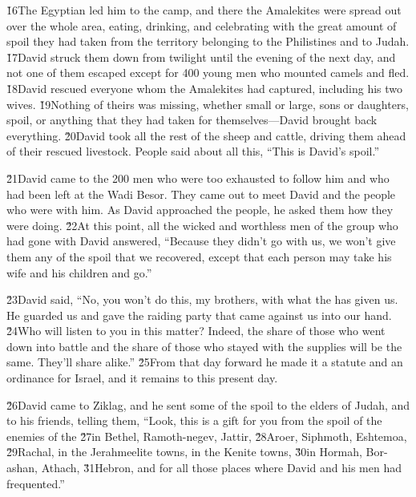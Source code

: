\v{16}The Egyptian led him to the camp, and there the Amalekites were spread out over the whole area, eating, drinking, and celebrating with the great amount of spoil they had taken from the territory belonging to the Philistines and to Judah. \v{17}David struck them down from twilight until the evening of the next day, and not one of them escaped except for 400 young men who mounted camels and fled. \v{18}David rescued everyone whom the Amalekites had captured, including his two wives. \v{19}Nothing of theirs was missing, whether small or large, sons or daughters, spoil, or anything that they had taken for themselves---David brought back everything. \v{20}David took all the rest of the sheep and cattle, driving them ahead of their rescued livestock. People said about all this, ``This is David's spoil.''

\v{21}David came to the 200 men who were too exhausted to follow him and who had been left at the Wadi Besor. They came out to meet David and the people who were with him. As David approached the people, he asked them how they were doing. \v{22}At this point, all the wicked and worthless men of the group who had gone with David answered, ``Because they didn't go with us, we won't give them any of the spoil that we recovered, except that each person may take his wife and his children and go.''

\v{23}David said, ``No, you won't do this, my brothers, with what the  has given us. He guarded us and gave the raiding party that came against us into our hand. \v{24}Who will listen to you in this matter? Indeed, the share of those who went down into battle and the share of those who stayed with the supplies will be the same. They'll share alike.'' \v{25}From that day forward he made it a statute and an ordinance for Israel, and it remains to this present day.

\v{26}David came to Ziklag, and he sent some of the spoil to the elders of Judah, and to his friends, telling them, ``Look, this is a gift for you from the spoil of the enemies of the  \v{27}in Bethel, Ramoth-negev, Jattir, \v{28}Aroer, Siphmoth, Eshtemoa, \v{29}Rachal, in the Jerahmeelite towns, in the Kenite towns, \v{30}in Hormah, Bor-ashan, Athach, \v{31}Hebron, and for all those places where David and his men had frequented.''

